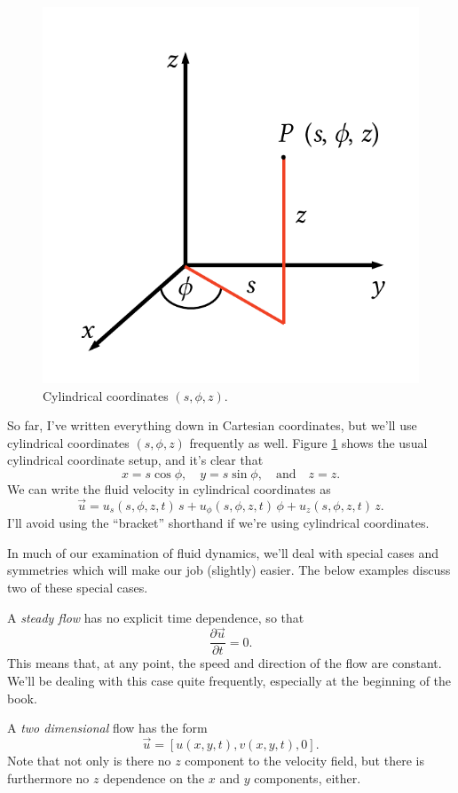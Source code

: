 \begin{figure}
\centering\includegraphics[width=0.5\linewidth]{Figures/Chapter1/fig_cyl_coord}
\caption{Cylindrical coordinates $(s, \phi, z)$.}
\label{fig_cyl_coord}
\end{figure}

So far, I've written everything down in Cartesian coordinates, but we'll use cylindrical coordinates $(s, \phi, z)$ frequently as well.  Figure \ref{fig_cyl_coord} shows the usual cylindrical coordinate setup, and it's clear that
\[
x = s \cos \phi, \quad y = s \sin \phi, \quad \text{and} \quad z = z.
\]
We can write the fluid velocity in cylindrical coordinates as
\begin{equation}
\label{eq_u_cyl}
\vec{u} = u_s(s, \phi, z, t) \, \unit{s} + u_\phi (s, \phi, z, t) \, \unit{\phi} + u_z(s, \phi, z, t) \, \unit{z}.
\end{equation}
I'll avoid using the ``bracket'' shorthand if we're using cylindrical coordinates.

In much of our examination of fluid dynamics, we'll deal with special cases and symmetries which will make our job (slightly) easier.  The below examples discuss two of these special cases.

\begin{example}
A \emph{steady flow} has no explicit time dependence, so that
\begin{equation}
\frac{\partial \vec{u}}{\partial t} = 0.
\end{equation}
This means that, at any point, the speed and direction of the flow are constant. We'll be dealing with this case quite frequently, especially at the beginning of the book.
\end{example}

\begin{example}
A \emph{two dimensional} flow has the form
\begin{equation}
\vec{u} = [u(x, y, t), v(x, y, t), 0].
\end{equation}
Note that not only is there no $z$ component to the velocity field, but there is furthermore no $z$ dependence on the
$x$ and $y$ components, either.
\end{example}


